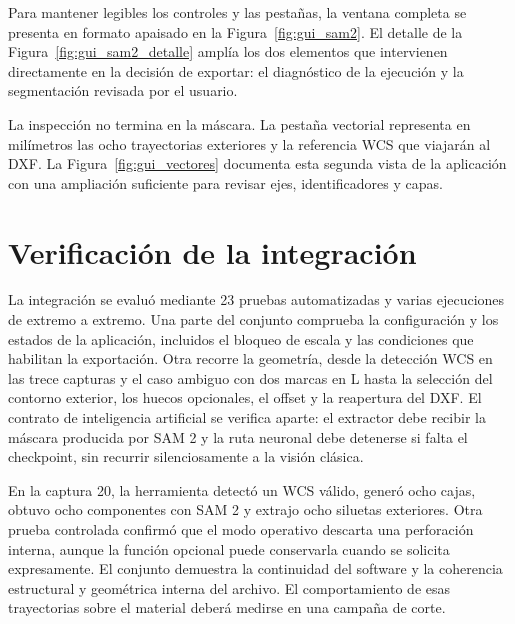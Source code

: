 Para mantener legibles los controles y las pestañas, la ventana completa se presenta en formato apaisado en la Figura~\ref{fig:gui_sam2}. El detalle de la Figura~\ref{fig:gui_sam2_detalle} amplía los dos elementos que intervienen directamente en la decisión de exportar: el diagnóstico de la ejecución y la segmentación revisada por el usuario.


La inspección no termina en la máscara. La pestaña vectorial representa en milímetros las ocho trayectorias exteriores y la referencia WCS que viajarán al DXF. La Figura~\ref{fig:gui_vectores} documenta esta segunda vista de la aplicación con una ampliación suficiente para revisar ejes, identificadores y capas.


\section{Verificación de la integración}

La integración se evaluó mediante 23 pruebas automatizadas y varias ejecuciones de extremo a extremo. Una parte del conjunto comprueba la configuración y los estados de la aplicación, incluidos el bloqueo de escala y las condiciones que habilitan la exportación. Otra recorre la geometría, desde la detección WCS en las trece capturas y el caso ambiguo con dos marcas en L hasta la selección del contorno exterior, los huecos opcionales, el offset y la reapertura del DXF. El contrato de inteligencia artificial se verifica aparte: el extractor debe recibir la máscara producida por SAM 2 y la ruta neuronal debe detenerse si falta el checkpoint, sin recurrir silenciosamente a la visión clásica.

En la captura 20, la herramienta detectó un WCS válido, generó ocho cajas, obtuvo ocho componentes con SAM 2 y extrajo ocho siluetas exteriores. Otra prueba controlada confirmó que el modo operativo descarta una perforación interna, aunque la función opcional puede conservarla cuando se solicita expresamente. El conjunto demuestra la continuidad del software y la coherencia estructural y geométrica interna del archivo. El comportamiento de esas trayectorias sobre el material deberá medirse en una campaña de corte.
